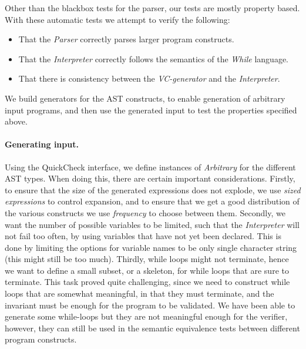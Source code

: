 Other than the blackbox tests for the parser, our tests are mostly property based.
With these automatic tests we attempt to verify the following:
\begin{itemize}
	\item That the \textit{Parser} correctly parses larger program constructs.
	\item That the \textit{Interpreter} correctly follows the semantics of the \textit{While} language.
	\item That there is consistency between the \textit{VC-generator} and the \textit{Interpreter}.
\end{itemize}
We build generators for the AST constructs, to enable generation of arbitrary input programs, and then use the generated input to test the properties specified above.

\paragraph{Generating input.}
Using the QuickCheck interface, we define instances of \textit{Arbitrary} for the different AST types.
When doing this, there are certain important considerations.
Firstly, to ensure that the size of the generated expressions does not explode, we use \textit{sized expressions} to control expansion, and to ensure that we get a good distribution of the various constructs we use \textit{frequency} to choose between them.
Secondly, we want the number of possible variables to be limited, such that the \textit{Interpreter} will not fail too often, by using variables that have not yet been declared.
This is done by limiting the options for variable names to be only single character string (this might still be too much).
Thirdly, while loops might not terminate, hence we want to define a small subset, or a skeleton, for while loops that are sure to terminate. 
This task proved quite challenging, since we need to construct while loops that are somewhat meaningful, in that they must terminate, and the invariant must be enough for the program to be validated. We have been able to generate some while-loops but they are not meaningful enough for the verifier, however, they can still be used in the semantic equivalence tests between different program constructs.

